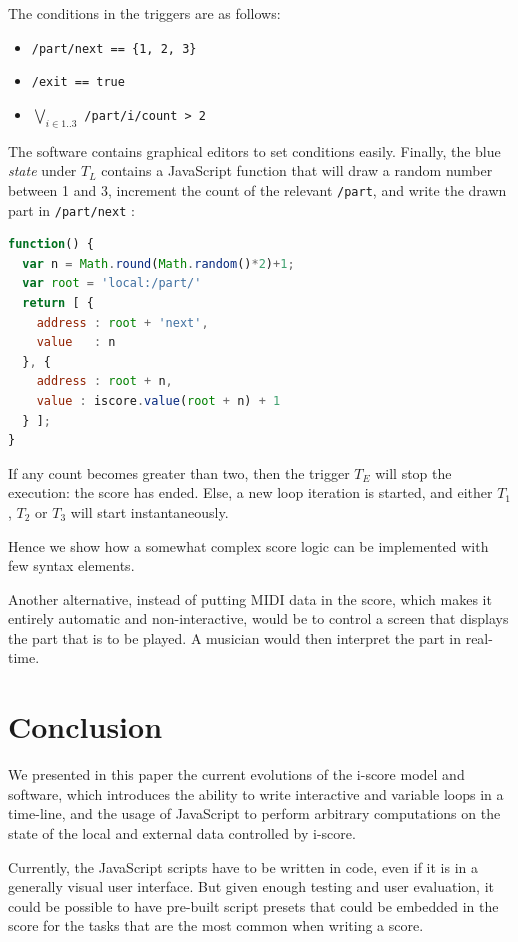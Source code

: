 \documentclass{article}
\newcommand{\state}{\textit{state}\xspace}
\begin{document}
The conditions in the triggers are as follows: 
{\scriptsize
\begin{itemize}
\item {} \lstinline|/part/next == {1, 2, 3}|
\item {} \lstinline{/exit == true}
\item {} $\displaystyle\bigvee_{i \in 1..3}$ \lstinline{/part/i/count > 2} 
\end{itemize}
}

The software contains graphical editors to set conditions easily.
Finally, the blue \state under $T_{L}$ contains a JavaScript function 
that will draw a random number between 1 and 3, 
increment the count of the relevant \verb|/part|, 
and write the drawn part in \verb|/part/next| : 

\begin{lstlisting}[language=JavaScript]
function() {      
  var n = Math.round(Math.random()*2)+1;	
  var root = 'local:/part/'
  return [ {
    address : root + 'next',
    value   : n 
  }, {
    address : root + n,
    value : iscore.value(root + n) + 1
  } ];
}
\end{lstlisting}

If any count becomes greater than two, then the
trigger $T_{E}$ will stop the execution: the score has ended. 
Else, a new loop iteration is started, and either 
$T_1$, $T_2$ or $T_3$ will start instantaneously.

Hence we show how a somewhat complex score logic 
can be implemented with few syntax elements.

Another alternative, instead of putting MIDI data in the score,
which makes it entirely automatic and non-interactive,  
would be to control a screen that displays the part that is 
to be played.
A musician would then interpret the part in real-time.
	
\section{Conclusion}
We presented in this paper the current evolutions of the i-score 
model and software, which introduces the ability to write interactive and variable loops in a time-line, 
and the usage of JavaScript to perform arbitrary computations on the state of the local and external data controlled by i-score.

Currently, the JavaScript scripts have to be written in code, even if it 
is in a generally visual user interface. 
But given enough testing and user evaluation, it could be possible to have pre-built script presets 
that could be embedded in the score for the tasks that are the most common when writing a score.
\end{document}
